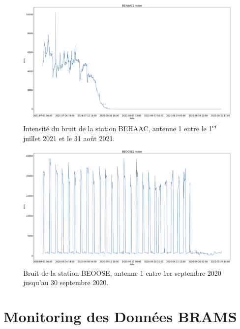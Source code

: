 \documentclass[11pt]{article}
\begin{document}
\begin{figure}[t]
    \begin{center}
        \includegraphics[scale=0.17]{BEHAAC1_2021-07-01_2021-08-31_noise.png}
        \caption{Intensité du bruit de la station BEHAAC, antenne 1 entre le 1\textsuperscript{er} juillet 2021 et le 31 août 2021.}
        \label{fig:BEHAAC-anomalie}
    \end{center}
\end{figure}

\begin{figure}[t]
    \begin{center}
        \includegraphics[scale=0.17]{BEOOSE1_2020-09-01_2020-09-30_noise.png}
        \caption{Bruit de la station BEOOSE, antenne 1 entre 1er septembre 2020 jusqu'au 30 septembre 2020.}
        \label{fig:BEOOSE-anomalie}
    \end{center}
\end{figure}

\section{Monitoring des Données BRAMS} \label{sec:monitoring}
\end{document}
